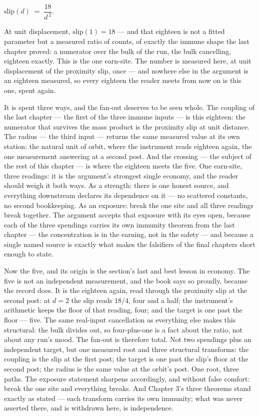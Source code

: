 \begin{center}
$\mathrm{slip}(d) \;=\; \dfrac{18}{d^{\,2}}.$
\end{center}

At unit displacement, $\mathrm{slip}(1) = 18$ --- and that eighteen is not a fitted
parameter but a measured ratio of counts, of exactly the immune shape the last chapter
proved: a numerator over the bulk of the run, the bulk cancelling, eighteen exactly.
This is the one earn-site. The number is measured here, at unit displacement of the
proximity slip, once --- and nowhere else in the argument is an eighteen measured, so
every eighteen the reader meets from now on is this one, spent again.

It is spent three ways, and the fan-out deserves to be seen whole. The coupling of the
last chapter --- the first of the three immune inputs --- is this eighteen: the
numerator that survives the mass product is the proximity slip at unit distance. The
radius --- the third input --- returns the same measured value at its own station: the
natural unit of orbit, where the instrument reads eighteen again, the one measurement
answering at a second post. And the crossing --- the subject of the rest of this
chapter --- is where the eighteen meets the five. One earn-site, three readings: it is
the argument's strongest single economy, and the reader should weigh it both ways. As
a strength: there is one honest source, and everything downstream declares its
dependence on it --- no scattered constants, no second bookkeeping. As an exposure:
break the one site and all three readings break together. The argument accepts that
exposure with its eyes open, because each of the three spendings carries its own
immunity theorem from the last chapter --- the concentration is in the earning, not in
the safety --- and because a single named source is exactly what makes the falsifiers
of the final chapters short enough to state.

Now the five, and its origin is the section's last and best lesson in economy. The
five is not an independent measurement, and the book says so proudly, because the
record does. It is the eighteen again, read through the proximity slip at the second
post: at $d = 2$ the slip reads $18/4$, four and a half; the instrument's arithmetic
keeps the floor of that reading, four; and the target is one past the floor --- five.
The same real-input cancellation as everything else makes this structural: the bulk
divides out, so four-plus-one is a fact about the ratio, not about any run's mood. The
fan-out is therefore total. Not two spendings plus an independent target, but one
measured root and three structural transforms: the coupling is the slip at the first
post; the target is one past the slip's floor at the second post; the radius is the
same value at the orbit's post. One root, three paths. The exposure statement sharpens
accordingly, and without false comfort: break the one site and everything breaks. And
Chapter 3's three theorems stand exactly as stated --- each transform carries its own
immunity; what was never asserted there, and is withdrawn here, is independence.

